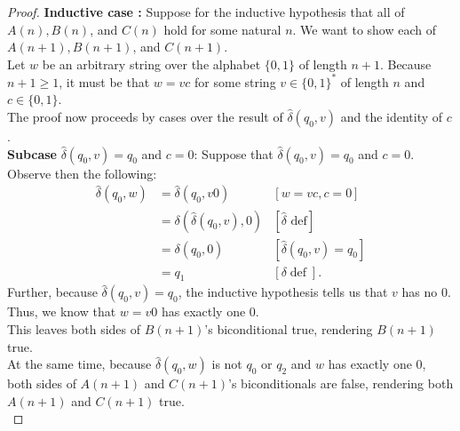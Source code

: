 \documentclass[10pt]{article}
\begin{document}
\begin{enumerate}[label={}]
\begin{proof}
                  \textbf{Inductive case :} Suppose for the inductive hypothesis that all of $A(n), B(n)$, and $C(n)$ hold for some natural $n$. We want to show each of $A(n+1), B(n+1)$, and $C(n+1)$.\\
                  Let $w$ be an arbitrary string over the alphabet $\{0,1\}$ of length $n+1$. Because $n+1 \geq 1$, it must be that $w=v c$ for some string $v \in\{0,1\}^*$ of length $n$ and $c \in\{0,1\}$.\\
                  The proof now proceeds by cases over the result of $\hat{\delta}\left(q_0, v\right)$ and the identity of $c$.\\

                  \textbf{Subcase }$\hat{\delta}\left(q_0, v\right)=q_0$ and $c=0$: Suppose that $\hat{\delta}\left(q_0, v\right)=q_0$ and $c=0$. Observe then the following:
                  $$
                        \begin{aligned}
                              \hat{\delta}\left(q_0, w\right) & =\hat{\delta}\left(q_0, v 0\right)                     & {[w=v c, c=0] }                                     \\
                                                              & =\delta\left(\hat{\delta}\left(q_0, v\right), 0\right) & {[\hat{\delta} \text { def}] }                      \\
                                                              & =\delta\left(q_0, 0\right)                             & {\left[\hat{\delta}\left(q_0, v\right)=q_0\right] } \\
                                                              & =q_1                                                   & {[\delta \operatorname{def}] . }
                        \end{aligned}
                  $$
                  Further, because $\hat{\delta}\left(q_0, v\right)=q_0$, the inductive hypothesis tells us that $v$ has no 0. Thus, we know that $w=v0$ has exactly one 0.\\
                  This leaves both sides of $B(n+1)$'s biconditional true, rendering $B(n+1)$ true.\\
                  At the same time, because $\hat{\delta}\left(q_0, w\right)$ is not $q_0$ or $q_2$ and $w$ has exactly one 0, both sides of $A(n+1)$ and $C(n+1)$'s biconditionals are false, rendering both $A(n+1)$ and $C(n+1)$ true.\\


\end{proof}
\end{enumerate}
\end{document}
